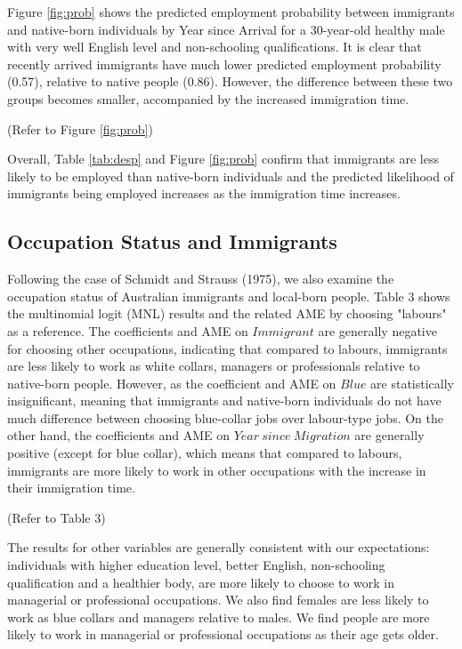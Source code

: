 Figure \ref{fig:prob} shows the predicted employment probability between immigrants and native-born individuals by Year since Arrival for a 30-year-old healthy male with very well English level and non-schooling qualifications.
It is clear that recently arrived immigrants have much lower predicted employment probability (0.57), relative to native people (0.86).
However, the difference between these two groups becomes smaller, accompanied by the increased immigration time.

\begin{center}
(Refer to Figure \ref{fig:prob})
\end{center}

Overall, Table \ref{tab:desp} and Figure \ref{fig:prob} confirm that immigrants are less likely to be employed than native-born individuals and the predicted likelihood of immigrants being employed increases as the immigration time increases.

\subsection{Occupation Status and Immigrants}
\label{sec:Occupation Status and Immigrants}

Following the case of Schmidt and Strauss (1975), we also examine the occupation status of Australian immigrants and local-born people.
Table 3 shows the multinomial logit (MNL) results and the related AME by choosing "labours" as a reference.
The coefficients and AME on $\mathit{Immigrant}$ are generally negative for choosing other occupations, indicating that compared to labours, immigrants are less likely to work as white collars, managers or professionals relative to native-born people.
However, as the coefficient and AME on $\mathit{Blue}$ are statistically insignificant, meaning that immigrants and native-born individuals do not have much difference between choosing blue-collar jobs over labour-type jobs.
On the other hand, the coefficients and AME on $\mathit{Year\ since\ Migration}$ are generally positive (except for blue collar), which means that compared to labours, immigrants are more likely to work in other occupations with the increase in their immigration time.

\begin{center}
(Refer to Table 3)
\end{center}

The results for other variables are generally consistent with our expectations: individuals with higher education level, better English, non-schooling qualification and a healthier body, are more likely to choose to work in managerial or professional occupations. We also find females are less likely to work as blue collars and managers relative to males. We find people are more likely to work in managerial or professional occupations as their age gets older.

